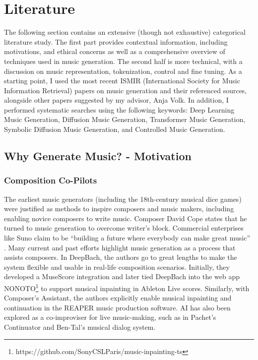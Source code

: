 

\chapter{Literature} \label{chap:data}
\pagestyle{fancy}

The following section contains an extensive (though not exhaustive) categorical literature study. The first part provides contextual information, including motivations, and ethical concerns as well as a comprehensive overview of techniques used in music generation. The second half is more technical, with a discussion on music representation, tokenization, control and fine tuning. 
As a starting point, I used the most recent ISMIR (International Society for Music Information Retrieval) papers on music generation and their referenced sources, alongside other papers suggested by my advisor, Anja Volk. In addition, I performed systematic searches using the following keywords: Deep Learning Music Generation, Diffusion Music Generation, Transformer Music Generation, Symbolic Diffusion Music Generation, and Controlled Music Generation.

\section{Why Generate Music? - Motivation}
\label{section:motivation}
\subsection{Composition Co-Pilots}
The earliest music generators (including the 18th-century musical dice games\cite{Nierhaus_2009}) were justified as methods to inspire composers and music makers, including enabling novice composers to write music. Composer David Cope\cite{Cope_1989} states that he turned to music generation to overcome writer’s block. Commercial enterprises like Suno claim to be “building a future where everybody can make great music” \cite{Suno_AI}. Many current and past efforts highlight music generation as a process that assists composers. In DeepBach\cite{Hadjeres_Pachet_Nielsen_2017}, the authors go to great lengths to make the system flexible and usable in real-life composition scenarios. Initially, they developed a MuseScore integration and later tied DeepBach into the web app NONOTO\footnote{https://github.com/SonyCSLParis/music-inpainting-ts} to support musical inpainting in Ableton Live scores. Similarly, with Composer’s Assistant\cite{Malandro_2023}, the authors explicitly enable musical inpainting and continuation in the REAPER music production software. AI has also been explored as a co-improviser for live music-making, such as in Pachet's Continuator\cite{Pachet_2003} and Ben-Tal's musical dialog system\cite{Kite-Powell_2023}.

